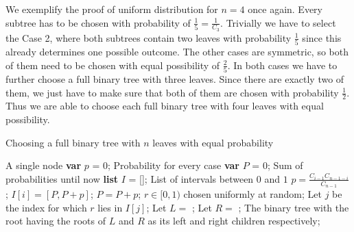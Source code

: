We exemplify the proof of uniform distribution for $n=4$ once again. Every subtree has to be chosen with probability of $\frac{1}{5} = \frac{1}{C_3}$. Trivially we have to select the Case 2, where both subtrees contain two leaves with probability $\frac{1}{5}$ since this already determines one possible outcome. The other cases are symmetric, so both of them need to be chosen with equal possibility of $\frac{2}{5}$. In both cases we have to further choose a full binary tree with three leaves. Since there are exactly two of them, we just have to make sure that both of them are chosen with probability $\frac{1}{2}$. Thus we are able to choose each full binary tree with four leaves with equal possibility.
\begin{algorithm} %
\caption{Choosing a full binary tree with $n$ leaves with equal probability} %
\label{alg:bin} %
\begin{algorithmic}
	\State \Return A single node
\Else 
	\State \textbf{var} $p$ = 0; \Comment Probability for every case
	\State \textbf{var} $P$ = 0; \Comment Sum of probabilities until now
	\State \textbf{list} $I$ = []; \Comment List of intervals between $0$ and $1$
		\State $p = \frac{C_{i-1} C_{n-1-i}}{C_{n-1}}$;
		\State $I[i] = [P, P+p]$;
		\State $P = P + p$;
	\EndFor
	\State $r \in [0,1)$ chosen uniformly at random;
	\State Let $j$ be the index for which $r$ lies in $I[j]$;
	\State Let $L = $ ;
	\State Let $R = $ ;
	\State \Return The binary tree with the root having the roots of $L$ and $R$ as its left and right children respectively;
\EndIf
\EndFunction
\end{algorithmic}
\end{algorithm}

